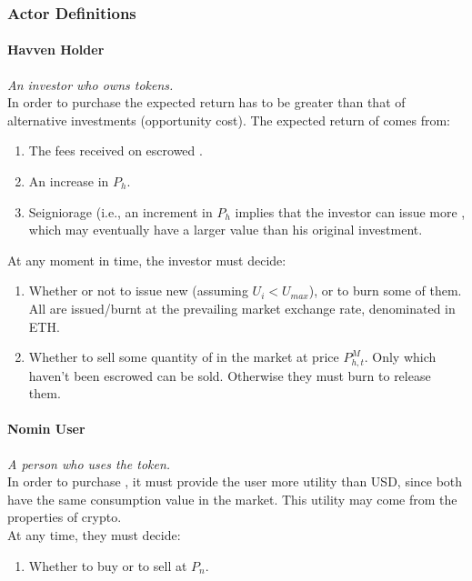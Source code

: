\subsubsection{Actor Definitions}
\paragraph{Havven Holder}
\emph{An investor who owns \HAV{} tokens.} \\

\noindent In order to purchase \HAV{} the expected return has to be greater than that of alternative investments (opportunity cost). The expected return of \HAV{} comes from:
\begin{enumerate}
\item{The fees received on escrowed \HAV{}.}
\item{An increase in $P_h$.}
\item{Seigniorage (i.e., an increment in $P_h$ implies that the investor can issue more \NOM{}, which may eventually have a larger value than his original investment.}
\end{enumerate}

\noindent At any moment in time, the investor must decide:
\begin{enumerate}
\item{Whether or not to issue new \NOM{} (assuming $U_i < U_{max}$), or to burn some of them. All \NOM{} are issued/burnt at the prevailing market exchange rate, denominated in ETH.}
\item{Whether to sell some quantity of \HAV{} in the market at price $P^M_{h,t}$. Only \HAV{} which haven't been escrowed can be sold. Otherwise they must burn \NOM{} to release them. }
\end{enumerate}

\paragraph{Nomin User}
\emph{A person who uses the \NOM{} token.} \\
 
\noindent In order to purchase \NOM{}, it must provide the user more utility than USD, since both have the same consumption value in the market. This utility may come from the properties of crypto. \\

\noindent At any time, they must decide: 
\begin{enumerate}
\item{Whether to buy or to sell \NOM{} at $P_n$.}
\end{enumerate}

